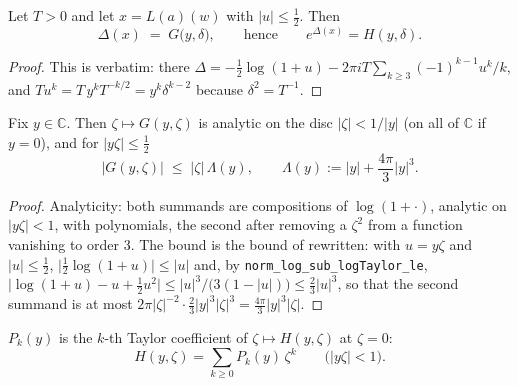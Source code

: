 \begin{lemma}
\label{lem:rsg_identify}
Let $T>0$ and let $x=L(a)(w)$ with $\lvert u\rvert\le\tfrac12$.  Then
\[
  \Delta(x)\;=\;G\bigl(y,\delta\bigr),\qquad\text{hence}\qquad e^{\Delta(x)}=H(y,\delta).
\]
\end{lemma}

\begin{proof}
This is  verbatim: there
$\Delta=-\tfrac12\log(1+u)-2\pi iT\sum_{k\ge3}(-1)^{k-1}u^{k}/k$, and
$T u^{k}=T\,y^{k}T^{-k/2}=y^{k}\delta^{k-2}$ because $\delta^{2}=T^{-1}$.
\end{proof}

\begin{lemma}
\label{lem:rsg_analytic}
Fix $y\in\mathbb{C}$.  Then $\zeta\mapsto G(y,\zeta)$ is analytic on the disc
$\lvert\zeta\rvert<1/\lvert y\rvert$ (on all of $\mathbb{C}$ if $y=0$), and for
$\lvert y\zeta\rvert\le\tfrac12$
\[
  \lvert G(y,\zeta)\rvert\;\le\;\lvert\zeta\rvert\,\Lambda(y),
  \qquad \Lambda(y):=\lvert y\rvert+\frac{4\pi}{3}\lvert y\rvert^{3}.
\]
\end{lemma}

\begin{proof}
Analyticity: both summands are compositions of $\log(1+\cdot)$, analytic on
$\lvert y\zeta\rvert<1$, with polynomials, the second after removing a $\zeta^{2}$ from a
function vanishing to order $3$.  The bound is the bound of
 rewritten: with $u=y\zeta$ and $\lvert u\rvert\le\tfrac12$,
$\lvert\tfrac12\log(1+u)\rvert\le\lvert u\rvert$ and, by
\texttt{norm\_log\_sub\_logTaylor\_le},
$\lvert\log(1+u)-u+\tfrac12u^{2}\rvert\le\lvert u\rvert^{3}/\bigl(3(1-\lvert u\rvert)\bigr)
\le\tfrac23\lvert u\rvert^{3}$, so that the second summand is at most
$2\pi\lvert\zeta\rvert^{-2}\cdot\tfrac23\lvert y\rvert^{3}\lvert\zeta\rvert^{3}
=\tfrac{4\pi}3\lvert y\rvert^{3}\lvert\zeta\rvert$.
\end{proof}

\begin{definition}
\label{def:rsg_poly}
$P_{k}(y)$ is the $k$-th Taylor coefficient of $\zeta\mapsto H(y,\zeta)$ at $\zeta=0$:
\[
  H(y,\zeta)=\sum_{k\ge0}P_{k}(y)\,\zeta^{k}\qquad\bigl(\lvert y\zeta\rvert<1\bigr).
\]
\end{definition}

